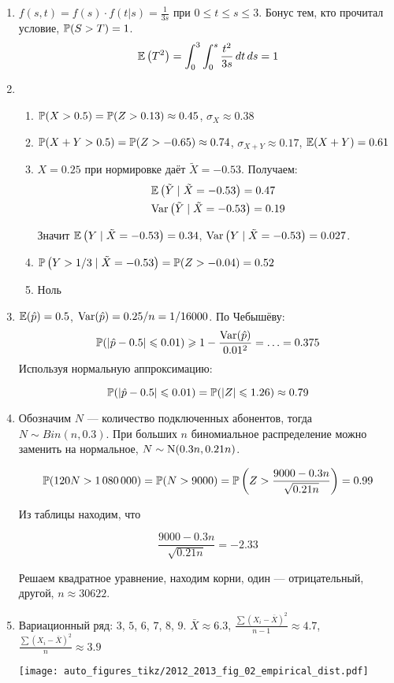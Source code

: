 \begin{enumerate}
\item  $f(s,t)=f(s)\cdot f(t|s)=\frac{1}{3s}$ при $0\leq t\leq s\leq 3$.
Бонус тем, кто прочитал условие, $\P(S>T)=1$.
\[
\E\left(T^2\right) = \int_0^3\int_0^s \frac{t^2}{3s}\,dt\,ds = 1
\]
\item
\begin{enumerate}
\item $\P(X>0.5) = \P(Z > 0.13) \approx 0.45$, $\sigma_X \approx 0.38$
\item $\P(X+Y>0.5) =
\P(Z>-0.65)\approx 0.74$,
$\sigma_{X+Y} \approx 0.17$, $\E(X+Y) = 0.61$

\item $X = 0.25$ при нормировке даёт $\tilde{X} = -0.53$.
Получаем:
\begin{align*}
& \E\left(\tilde{Y} \mid \tilde{X} = -0.53\right) = 0.47 \\
& \Var\left(\tilde{Y} \mid \tilde{X} = -0.53\right) = 0.19
\end{align*}

Значит $\E\left(Y \mid \tilde{X} = -0.53\right) = 0.34$,
$\Var\left(Y \mid \tilde{X} = -0.53\right)=0.027$.

\item $\P\left(Y > 1/3 \mid \tilde{X} = -0.53\right) = \P(Z > -0.04) = 0.52$
\item Ноль
\end{enumerate}
\item $\E(\hat{p})=0.5$, $\Var(\hat{p})=0.25/n=1/16000$. По Чебышёву:
\[
\P(|\hat{p}-0.5|\leq 0.01)\geq 1-\frac{\Var(\hat{p})}{0.01^2}=\ldots=0.375
\]
Используя нормальную аппроксимацию:

\[
\P(|\hat{p}-0.5|\leq 0.01)=\P(|Z|\leq 1.26)\approx 0.79
\]
\item Обозначим $N$ — количество подключенных абонентов, тогда $N\sim Bin(n,0.3)$.
При больших $n$ биномиальное распределение можно заменить на нормальное,
$N\sim \cN(0.3n,0.21n)$.

\[
\P(120N>1\,080\,000)=\P(N>9000)=\P\left(Z>\frac{9000-0.3n}{\sqrt{0.21n}}\right)=0.99
\]

Из таблицы находим, что

\[
\frac{9000-0.3n}{\sqrt{0.21n}} = -2.33
\]

Решаем квадратное уравнение, находим корни, один — отрицательный, другой, $n\approx 30622$.
\item

Вариационный ряд: $3$, $5$, $6$, $7$, $8$, $9$. $\bar{X}\approx 6.3$,
$\frac{\sum (X_i-\bar{X})^2}{n-1}\approx 4.7$,
$\frac{\sum (X_i-\bar{X})^2}{n}\approx 3.9$


\begin{minipage}{0.6\textwidth}
\begin{center}
\texttt{[image: auto\_figures\_tikz/2012\_2013\_fig\_02\_empirical\_dist.pdf]}
\end{center}
\end{minipage}
\end{enumerate}




